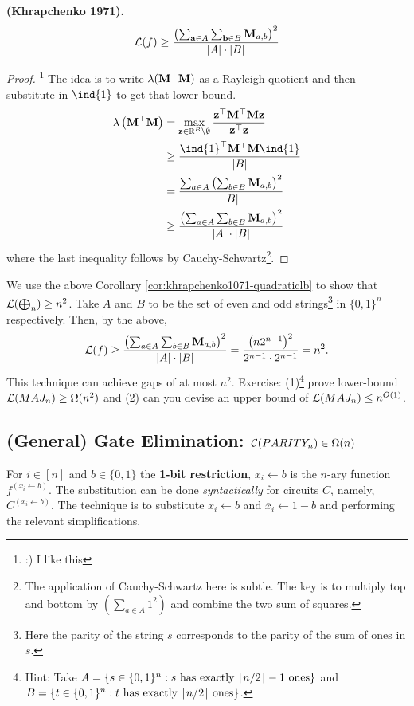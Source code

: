 \documentclass[11pt]{article}
\begin{document}
	\begin{corollary}
		\label{cor:khrapchenko1071-quadraticlb}
		\textbf{(Khrapchenko 1971).}
		\[\mathcal{L}(f) \geq \frac{\left(\sum_{\mathbf{a} \in A}\sum_{\mathbf{b} \in B} \mathbf{M}_{a,b}\right)^2}{|A|\cdot|B|}\]
	\end{corollary}
	\begin{proof}
		\footnote{:) I like this} The idea is to write $\lambda(\mathbf{M}^{\top}\mathbf{M})$ as a Rayleigh quotient and then substitute in $\ind{1}$ to get that lower bound.
		\begin{align*}
			\lambda\left(\mm{M}^{\top}\mm{M}\right) &= \max_{\vv{z} \in \RR^{B}\backslash \emptyset} \frac{\vv{z}^{\top}\mm{M}^{\top}\mm{M}\vv{z}}{\vv{z}^{\top}\vv{z}}\\
			&\geq \frac{\ind{1}^{\top}\mm{M}^{\top}\mm{M}\ind{1}}{|B|}\\
			&=\frac{\sum_{a \in A}\left(\sum_{b \in B}\mm{M}_{a,b}\right)^2}{|B|}\\
			&\geq \frac{\left(\sum_{a \in A} \sum_{b \in B} \mm{M}_{a,b}\right)^2}{|A|\cdot|B|}
		\end{align*}
		where the last inequality follows by Cauchy-Schwartz\footnote{The application of Cauchy-Schwartz here is subtle. The key is to multiply top and bottom by $\left(\sum_{a \in A} 1^2\right)$ and combine the two sum of squares.}.
	\end{proof}
	
	We use the above Corollary \ref{cor:khrapchenko1071-quadraticlb} to show that $\mathcal{L}(\operatorname{\bigoplus}_n) \geq n^2$. Take $A$ and $B$ to be the set of even and odd strings\footnote{Here the parity of the string $s$ corresponds to the parity of the sum of ones in $s$.} in $\{0,1\}^n$ respectively. Then, by the above,
	\[\mathcal{L}(f) \geq \frac{\left(\sum_{a \in A}\sum_{b \in B} \mathbf{M}_{a,b}\right)^2}{|A|\cdot|B|} = \frac{\left(n2^{n-1}\right)^2}{2^{n-1}\cdot 2^{n-1}} = n^2.\]
	This technique can achieve gaps of at most $n^2$. Exercise: (1)\footnote{Hint: Take $A = \{s \in \{0,1\}^n:s\mbox{ has exactly $\lceil n/2\rceil-1$ ones}\}$ and $B = \{t \in \{0,1\}^n:t\mbox{ has exactly $\lceil n/2\rceil$ ones}\}$.} prove lower-bound $\mathcal{L}(MAJ_n) \geq \Omega(n^2)$ and (2) can you devise an upper bound of $\mathcal{L}(MAJ_n) \leq n^{O(1)}$.
	
	\subsection{(General) Gate Elimination: \texorpdfstring{$\mathcal{C}(PARITY_n) \in \Omega(n)$}{C(PARITYn) in Omega(n)}}
	\begin{definition}
		For $i \in [n]$ and $b \in \{0,1\}$ the \textbf{1-bit restriction}, $x_i \leftarrow b$ is the $n$-ary function $f^{(x_i \leftarrow b)}$. The substitution can be done \emph{syntactically} for circuits $C$, namely, $C^{(x_i \leftarrow b)}$. The technique is to substitute $x_i \leftarrow b$ and $\overline{x}_i \leftarrow 1 - b$ and performing the relevant simplifications.
	\end{definition}
	
\end{document}
